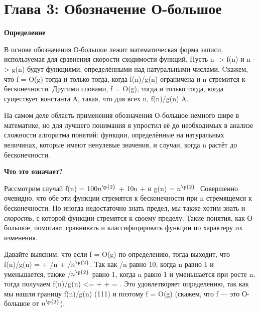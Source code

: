 
\chapter*{Глава 3: Обозначение О-большое}

\vspace{\baselineskip}

\textbf{Определение}

\vspace{\baselineskip}
В основе обозначения О-большое лежит математическая форма записи, используемая для сравнения скорости сходимости функций. Пусть n -> f(n) и n -> g(n) будут функциями, определёнными над натуральными числами. Cкажем, что f = O(g) тогда и только тогда, когда f(n)/g(n) ограничена и n стремится к бесконечности. Другими словами, f = O(g), тогда и только тогда, когда существует  константа A, такая, что для всех n, f(n)/g(n) \le A.

\vspace{\baselineskip}
На самом деле область применения обозначения О-большое немного шире в математике, но для лучшего понимания  я упростил её до необходимых  в анализе сложности алгоритма понятий: функции, определённые на натуральных величинах, которые имеют ненулевые значения, и случаи, когда n растёт до бесконечности.

\vspace{\baselineskip}
\textbf{Что это означает?}

\vspace{\baselineskip}
Рассмотрим случай f(n) = 100$n^{\p{2}}$ + 10n +  и g(n) = $n^{\p{2}}$. Совершенно очевидно, что обе эти функции стремятся к бесконечности при n стремящемся к бесконечности. Но иногда недостаточно знать предел, мы также хотим знать и \textit{скорость}, с которой функции стремятся к своему пределу. Такие понятия, как О-большое, помогают сравнивать и классифицировать функции по характеру их изменения.

\vspace{\baselineskip}
Давайте выясним, что если f = O(g)  по определению, тогда выходит, что f(n)/g(n) =  + /n + /$n^{\p{2}}$. Так как /n равно 10, когда n равно 1 и уменьшается, также /$n^{\p{2}}$ равно 1, когда n равно 1 и уменьшается при росте n, тогда получаем f(n)/g(n) <=  +  +  = . Это удовлетворяет определению,  так как мы нашли границу f(n)/g(n) (111) и поэтому f = O(g) (скажем, что f --- это О-большое от $n^{\p{2}}$). 

